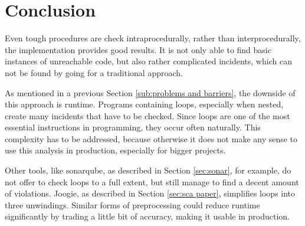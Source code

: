 
\chapter{Conclusion}
\label{cha:conclusion}

Even tough procedures are check intraprocedurally, rather than interprocedurally, the implementation provides good results. It is not only able to find basic instances of unreachable code, but also rather complicated incidents, which can not be found by going for a traditional approach.


As mentioned in a previous Section \ref{sub:problems and barriers}, the downside of this approach is runtime. Programs containing loops, especially when nested, create many incidents that have to be checked. Since loops are one of the most essential instructions in programming, they occur often naturally. 
This complexity has to be addressed, because otherwise it does not make any sense to use this analysis in production, especially for bigger projects.


Other tools, like sonarqube, as described in Section \ref{sec:sonar}, for example, do not offer to check loops to a full extent, but still manage to find a decent amount of violations. Joogie, as described in Section \ref{sec:sca paper}, simplifies loops into three unwindings. Similar forms of preprocessing could reduce runtime significantly by trading a little bit of accuracy, making it usable in production. 